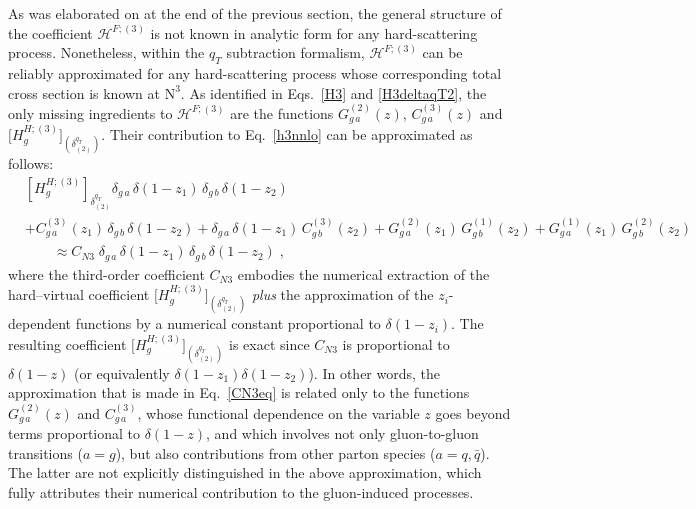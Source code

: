 \documentclass[12pt]{article}
\DeclareRobustCommand{\nn}{\nonumber}
\DeclareRobustCommand{\qt}{\ensuremath{q_T}\xspace}
\DeclareRobustCommand{\cH}{\ensuremath{\mathcal{H}}}
\DeclareRobustCommand{\LO}{\text{LO}\xspace}
\DeclareRobustCommand{\N}[1]{\ensuremath{\text{N}^{#1}}} %
\begin{document}
As was elaborated on at the end of the previous section, the general structure of the coefficient $\cH^{F;(3)}$ is not known in analytic form for any hard-scattering process. Nonetheless, within the $\qt$ subtraction  formalism, $\cH^{F;(3)}$ can be reliably approximated for any hard-scattering process whose corresponding total cross section is known at \N3\LO. 
As identified in Eqs.~\eqref{H3} and \eqref{H3deltaqT2}, the only missing ingredients to $\cH^{F;(3)}$ are the functions $G^{(2)}_{g\,a}(z)$, $C^{(3)}_{g\,a}(z)$ and $ \bigl[H^{H;(3)}_{g}\bigr]_{(\delta^{\qt}_{(2)})}$. 
Their contribution to Eq.~\eqref{h3nnlo} can be approximated as follows:
\begin{align}
  &
  \left[ H_g^{H;(3)} \right]_{\delta^{\qt}_{(2)}} 
  \delta_{g\,a} \, \delta(1-z_1) \, \delta_{g\,b} \, \delta(1-z_2) 
  \nn\\&
  + C^{(3)}_{g\,a}(z_1) \, \delta_{g\,b} \, \delta(1-z_2) 
  + \delta_{g\,a} \, \delta(1-z_1) \, C^{(3)}_{g\,b}(z_2) 
  + G^{(2)}_{g\,a}(z_1) \, G^{(1)}_{g\,b}(z_2) 
  + G^{(1)}_{g\,a}(z_1) \, G^{(2)}_{g\,b}(z_2) 
  \nn\\&\qquad\approx
  C_{N3} \; \delta_{g\,a} \, \delta(1-z_1) \, \delta_{g\,b} \, \delta(1-z_2) \;,
  \label{CN3eq}
\end{align}
where the third-order coefficient $C_{N3}$ embodies the numerical extraction of the hard--virtual coefficient $\big[H^{H;(3)}_{g}\big]_{(\delta^{\qt}_{(2)})}$  \textit{plus} the approximation of the $z_i$-dependent functions by a numerical constant proportional to $\delta(1-z_i)$. The resulting coefficient $\big[H^{H;(3)}_{g}\big]_{(\delta^{\qt}_{(2)})}$ is exact since $C_{N3}$ is proportional to $\delta(1-z)$ (or equivalently $\delta(1-z_1)\delta(1-z_2)$). In other words, the approximation that is made in Eq.~\eqref{CN3eq} is related only to the functions  $G^{(2)}_{g\,a}(z)$ and $C^{(3)}_{g\,a}
$, whose functional dependence on the variable $z$ goes beyond terms proportional to $\delta(1-z)$, and which involves not only gluon-to-gluon transitions ($a=g$), but also contributions from 
other parton species ($a=q,\bar q$). The latter are not explicitly distinguished in the above approximation, which fully attributes their numerical contribution to the gluon-induced processes. 
\end{document}
